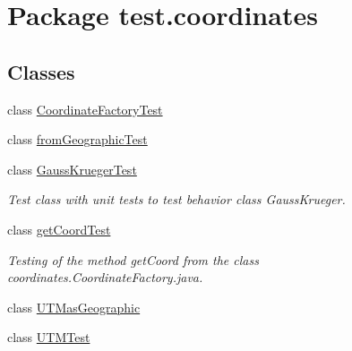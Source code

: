 \hypertarget{namespacetest_1_1coordinates}{}\section{Package test.\+coordinates}
\label{namespacetest_1_1coordinates}
\subsection*{Classes}
\begin{DoxyCompactItemize}
\item 
class \hyperlink{classtest_1_1coordinates_1_1_coordinate_factory_test}{Coordinate\+Factory\+Test}
\item 
class \hyperlink{classtest_1_1coordinates_1_1from_geographic_test}{from\+Geographic\+Test}
\item 
class \hyperlink{classtest_1_1coordinates_1_1_gauss_krueger_test}{Gauss\+Krueger\+Test}
\begin{DoxyCompactList}\small\item\em Test class with unit tests to test behavior class Gauss\+Krueger. \end{DoxyCompactList}\item 
class \hyperlink{classtest_1_1coordinates_1_1get_coord_test}{get\+Coord\+Test}
\begin{DoxyCompactList}\small\item\em Testing of the method get\+Coord from the class coordinates.\+Coordinate\+Factory.\+java. \end{DoxyCompactList}\item 
class \hyperlink{classtest_1_1coordinates_1_1_u_t_mas_geographic}{U\+T\+Mas\+Geographic}
\item 
class \hyperlink{classtest_1_1coordinates_1_1_u_t_m_test}{U\+T\+M\+Test}
\end{DoxyCompactItemize}
